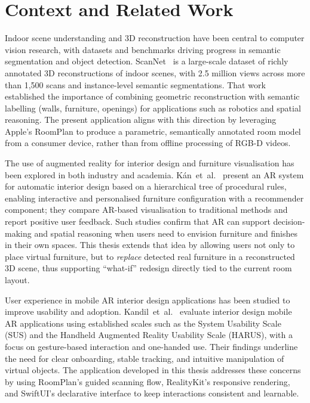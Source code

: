 \documentclass[12pt]{report}
\begin{document}
\tableofcontents

\newpage
{}

\section*{Context and Related Work}

Indoor scene understanding and 3D reconstruction have been central to computer vision research, with datasets and benchmarks driving progress in semantic segmentation and object detection. ScanNet~\cite{dai2017scannet} is a large-scale dataset of richly annotated 3D reconstructions of indoor scenes, with 2.5 million views across more than 1,500 scans and instance-level semantic segmentations. That work established the importance of combining geometric reconstruction with semantic labelling (walls, furniture, openings) for applications such as robotics and spatial reasoning. The present application aligns with this direction by leveraging Apple's RoomPlan to produce a parametric, semantically annotated room model from a consumer device, rather than from offline processing of RGB-D videos.

The use of augmented reality for interior design and furniture visualisation has been explored in both industry and academia. K\'an~et~al.~\cite{kan2021ar} present an AR system for automatic interior design based on a hierarchical tree of procedural rules, enabling interactive and personalised furniture configuration with a recommender component; they compare AR-based visualisation to traditional methods and report positive user feedback. Such studies confirm that AR can support decision-making and spatial reasoning when users need to envision furniture and finishes in their own spaces. This thesis extends that idea by allowing users not only to place virtual furniture, but to \emph{replace} detected real furniture in a reconstructed 3D scene, thus supporting ``what-if'' redesign directly tied to the current room layout.

User experience in mobile AR interior design applications has been studied to improve usability and adoption. Kandil~et~al.~\cite{kandil2021ux} evaluate interior design mobile AR applications using established scales such as the System Usability Scale (SUS) and the Handheld Augmented Reality Usability Scale (HARUS), with a focus on gesture-based interaction and one-handed use. Their findings underline the need for clear onboarding, stable tracking, and intuitive manipulation of virtual objects. The application developed in this thesis addresses these concerns by using RoomPlan's guided scanning flow, RealityKit's responsive rendering, and SwiftUI's declarative interface to keep interactions consistent and learnable.









\end{document}
